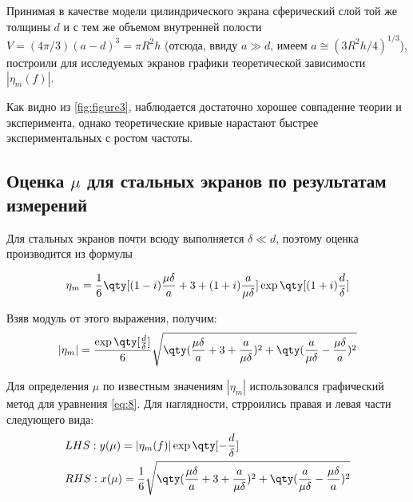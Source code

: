 Принимая в качестве модели цилиндрического экрана сферический слой той же толщины $d$ и с тем же объемом внутренней
полости $V=(4\pi/3)(a-d)^3=\pi R^2h$ (отсюда, ввиду $a\gg d$, имеем $a\cong (3R^2h/4)^{1/3}$), построили для исследуемых
экранов графики теоретической зависимости $|\eta_m(f)|$.

Как видно из \ref{fig:figure3}, наблюдается достаточно хорошее совпадение теории и эксперимента, однако теоретические
кривые нарастают быстрее экспериментальных с ростом частоты.

\subsection{Оценка $\mu$ для стальных экранов по результатам измерений}

Для стальных экранов почти всюду выполняется $\delta \ll d$, поэтому оценка производится из формулы

\begin{gather}
	\eta_m = \frac16\qty[(1-i)\frac{\mu \delta}{a} + 3 + (1+i)\frac{a}{\mu \delta}]\exp\qty[(1+i)\frac{d}{\delta}]
\end{gather}

Взяв модуль от этого выражения, получим:
\begin{gather}
	|\eta_m| = \frac{\exp\qty[\frac{d}{\delta}]}{6}\sqrt{\qty(\frac{\mu \delta}{a} +3 + \frac{a}{\mu \delta} )^2 + \qty(\frac{a}{\mu \delta} - \frac{\mu \delta}{a})^2}
	\label{eq:8}
\end{gather}

Для определения $\mu$ по известным значениям $|\eta_m|$ использовался графический метод для уравнения \eqref{eq:8}.
Для наглядности, стрроились правая и левая части следующего вида:
\begin{equation}
	\begin{aligned}
		&LHS: y(\mu) = |\eta_m(f)|\exp\qty[-\frac{d}{\delta}]\\ 
		&RHS: x(\mu) = \frac16 \sqrt{\qty(\frac{\mu \delta}{a} +3 + \frac{a}{\mu \delta} )^2 + \qty(\frac{a}{\mu \delta} - \frac{\mu \delta}{a})^2}
	\end{aligned}
		\label{eq:9}
\end{equation}


